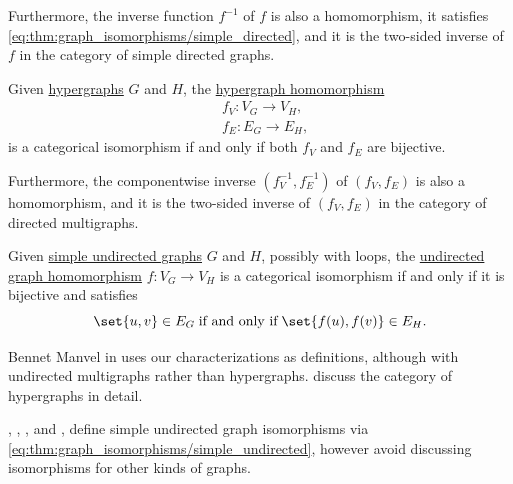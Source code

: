 \begin{proposition}
\begin{thmenum}
    Furthermore, the inverse function \( f^{-1} \) of \( f \) is also a homomorphism, it satisfies \eqref{eq:thm:graph_isomorphisms/simple_directed}, and it is the two-sided inverse of \( f \) in the category of simple directed graphs.

     Given \hyperref[def:hypergraph]{hypergraphs} \( G \) and \( H \), the \hyperref[def:hypergraph/homomorphism]{hypergraph homomorphism}
    \begin{align*}
      &f_V: V_G \to V_H, \\
      &f_E: E_G \to E_H,
    \end{align*}
    is a categorical isomorphism if and only if both \( f_V \) and \( f_E \) are bijective.

    Furthermore, the componentwise inverse \( (f_V^{-1}, f_E^{-1}) \) of \( (f_V, f_E) \) is also a homomorphism, and it is the two-sided inverse of \( (f_V, f_E) \) in the category of directed multigraphs.

     Given \hyperref[def:undirected_graph]{simple undirected graphs} \( G \) and \( H \), possibly with loops, the \hyperref[def:undirected_graph/homomorphism]{undirected graph homomorphism} \( f: V_G \to V_H \) is a categorical isomorphism if and only if it is bijective and satisfies
    \begin{equation}\label{eq:thm:graph_isomorphisms/simple_undirected}
      \set{ u, v } \in E_G \T{if and only if} \set{ f(u), f(v) } \in E_H.
    \end{equation}
  \end{thmenum}
\end{proposition}
\begin{comments}
  \item Bennet Manvel in  uses our characterizations as definitions, although with undirected multigraphs rather than hypergraphs.  discuss the category of hypergraphs in detail.

  , , ,  and ,  define simple undirected graph isomorphisms via \eqref{eq:thm:graph_isomorphisms/simple_undirected}, however avoid discussing isomorphisms for other kinds of graphs.
\end{comments}

